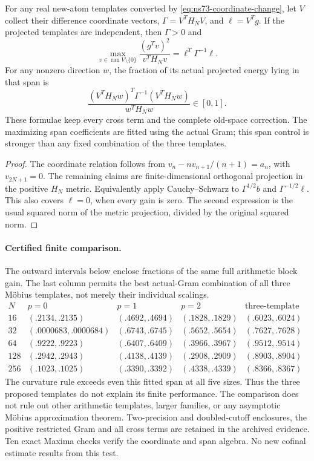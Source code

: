 \begin{proposition}
\label{prop:ns73-span}
For any real new-atom templates converted by
\eqref{eq:ns73-coordinate-change}, let $V$ collect their difference
coordinate vectors, $\Gamma=V^TH_NV$, and $\ell=V^Tg$.
If the projected templates are independent, then $\Gamma>0$ and
\[
 \max_{v\in\operatorname{ran}V\setminus\{0\}}
       \frac{(g^Tv)^2}{v^TH_Nv}=\ell^T\Gamma^{-1}\ell.
\]
For any nonzero direction $w$, the fraction of its actual projected
energy lying in that span is
\[
 \frac{(V^TH_Nw)^T\Gamma^{-1}(V^TH_Nw)}{w^TH_Nw}\in[0,1].
\]
These formulae keep every cross term and the complete old-space correction.
The maximizing span coefficients are fitted using the actual Gram; this
span control is stronger than any fixed combination of the three templates.
\end{proposition}
\begin{proof}
The coordinate relation follows from
$v_n-nv_{n+1}/(n+1)=a_n$, with $v_{2N+1}=0$.
The remaining claims are finite-dimensional orthogonal projection in the
positive $H_N$ metric. Equivalently apply Cauchy--Schwarz to
$\Gamma^{1/2}b$ and $\Gamma^{-1/2}\ell$. This also covers $\ell=0$,
when every gain is zero. The second expression is the usual squared norm
of the metric projection, divided by the original squared norm.
\end{proof}

\paragraph{Certified finite comparison.}
The outward intervals below enclose fractions of the same full arithmetic
block gain. The last column permits the best actual-Gram combination of
all three M\"obius templates, not merely their individual scalings.
\[
\begin{array}{c|cccc}
N& p=0&p=1&p=2&\text{three-template span}\\ \hline
16&(.2134,.2135)&(.4692,.4694)&(.1828,.1829)&(.6023,.6024)\\
32&(.0000683,.0000684)&(.6743,.6745)&(.5652,.5654)&(.7627,.7628)\\
64&(.9222,.9223)&(.6407,.6409)&(.3966,.3967)&(.9512,.9514)\\
128&(.2942,.2943)&(.4138,.4139)&(.2908,.2909)&(.8903,.8904)\\
256&(.1023,.1025)&(.3390,.3392)&(.4338,.4339)&(.8366,.8367)
\end{array}
\]
The curvature rule exceeds even this fitted span at all five sizes.
Thus the three proposed templates do not explain its finite performance.
The comparison does not rule out other arithmetic templates, larger
families, or any asymptotic M\"obius approximation theorem.
Two-precision and doubled-cutoff enclosures, the positive restricted Gram
and all cross terms are retained in the archived evidence. Ten exact
Maxima checks verify the coordinate and span algebra. No new cofinal
estimate results from this test.
